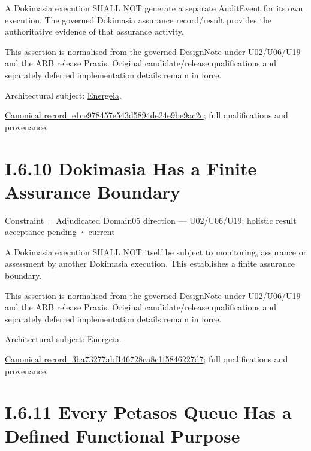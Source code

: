 A Dokimasia execution SHALL NOT generate a separate AuditEvent for its own execution. The governed Dokimasia assurance record/result provides the authoritative evidence of that assurance activity.



This assertion is normalised from the governed DesignNote under U02/U06/U19 and the ARB release Praxis. Original candidate/release qualifications and separately deferred implementation details remain in force.



Architectural subject: \hyperref[element:fb3f37a6ac614415ac486a6de9d35994]{Energeia}.


{\footnotesize \href{../../../../../../../continuum/motivation/constraint/e1ce978457e543d5894de24e9be9ac2c.md}{Canonical record: e1ce978457e543d5894de24e9be9ac2c}; full qualifications and provenance.}\par
\section*{I.6.10 Dokimasia Has a Finite Assurance Boundary}
\label{navigation:I.6.10}

\label{element:3ba73277abf146728ca8c1f5846227d7}
{\small Constraint · Adjudicated Domain05 direction — U02/U06/U19; holistic result acceptance pending · current}\par

A Dokimasia execution SHALL NOT itself be subject to monitoring, assurance or assessment by another Dokimasia execution. This establishes a finite assurance boundary.



This assertion is normalised from the governed DesignNote under U02/U06/U19 and the ARB release Praxis. Original candidate/release qualifications and separately deferred implementation details remain in force.



Architectural subject: \hyperref[element:fb3f37a6ac614415ac486a6de9d35994]{Energeia}.


{\footnotesize \href{../../../../../../../continuum/motivation/constraint/3ba73277abf146728ca8c1f5846227d7.md}{Canonical record: 3ba73277abf146728ca8c1f5846227d7}; full qualifications and provenance.}\par
\section*{I.6.11 Every Petasos Queue Has a Defined Functional Purpose}
\label{navigation:I.6.11}

